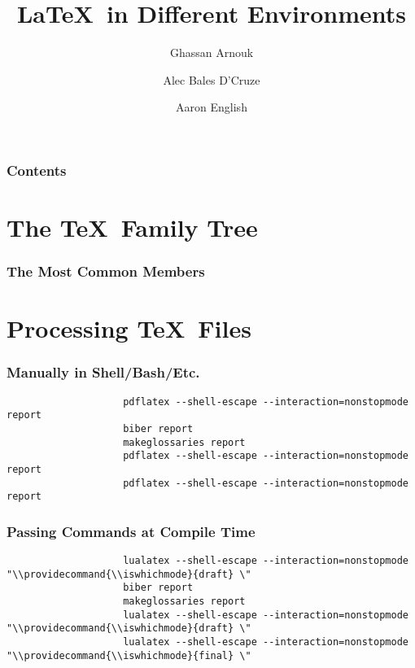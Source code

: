 \documentclass{beamer}
\title{\LaTeX~in Different Environments}
\author{Ghassan Arnouk \and
            Alec Bales D'Cruze \and
            Aaron English}
\begin{document}
    \begin{frame}
        \titlepage
    \end{frame}
    \begin{frame}
        \frametitle{Contents}
        \tableofcontents
    \end{frame}
    \section{The \TeX~Family Tree}
        \begin{frame}
            \frametitle{The Most Common Members}
            
        \end{frame}
    \section{Processing \TeX~Files}
        \begin{frame}[fragile]
            \frametitle{Manually in Shell/Bash/Etc.}
            \begin{centering}
                \begin{verbatim}
                    pdflatex --shell-escape --interaction=nonstopmode report
                    biber report
                    makeglossaries report
                    pdflatex --shell-escape --interaction=nonstopmode report
                    pdflatex --shell-escape --interaction=nonstopmode report
                \end{verbatim}
            \end{centering}
        \end{frame}
        \begin{frame}[fragile]
            \frametitle{Passing Commands at Compile Time}
            \begin{centering}
                \begin{verbatim}
                    lualatex --shell-escape --interaction=nonstopmode "\\providecommand{\\iswhichmode}{draft} \"
                    biber report
                    makeglossaries report
                    lualatex --shell-escape --interaction=nonstopmode "\\providecommand{\\iswhichmode}{draft} \"
                    lualatex --shell-escape --interaction=nonstopmode "\\providecommand{\\iswhichmode}{final} \"
                \end{verbatim}
            \end{centering}
        \end{frame}
\end{document}
